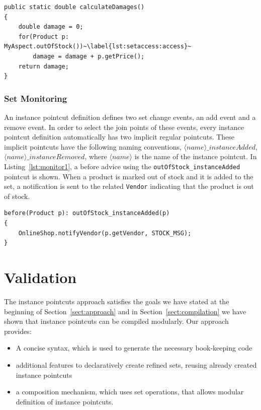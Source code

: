 \documentclass{acm_proc_article-sp}
\newcommand{\lstinln}[1]{\lstinline~#1~}
\begin{document}
\begin{lstlisting}[float=h!, caption={Calculate a damage estimate for out of stock products}, label={lst:setaccess}]
public static double calculateDamages()
{
	double damage = 0;
	for(Product p: MyAspect.outOfStock())~\label{lst:setaccess:access}~
		damage = damage + p.getPrice();
	return damage;
}
\end{lstlisting}



\subsubsection{Set Monitoring}
An instance pointcut definition defines two set change events, an add event and a remove event. In order to select the join points of these events, every instance pointcut definition automatically has two implicit regular pointcuts. These implicit pointcuts have the following naming conventions, $\langle name \rangle\_instanceAdded$, $\langle name \rangle\_instanceRemoved$, where $\langle name \rangle$ is the name of the instance pointcut. In Listing~\ref{lst:monitor1}, a before advice using the \lstinln{outOfStock_instanceAdded} pointcut is shown. 
When a product is marked out of stock and it is added to the set, a notification is sent to the related \lstinln{Vendor} indicating that the product is out of stock.

\begin{lstlisting}[float=h!, caption={Set monitoring pointcut used to notify vendors}, label={lst:monitor1}]
before(Product p): outOfStock_instanceAdded(p)
{
	OnlineShop.notifyVendor(p.getVendor, STOCK_MSG);
}
\end{lstlisting}




\section{Validation}
\label{sect:checking}
The instance pointcuts approach satisfies the goals we have stated at the beginning of Section~\ref{sect:approach} and in Section~\ref{sect:compilation} we have shown that instance pointcuts can be compiled modularly. 
Our approach provides:

\begin{itemize}
\item A concise syntax, which is used to generate the necessary book-keeping code
\item additional features to declaratively create refined sets, reusing already created instance pointcuts
\item a composition mechanism, which uses set operations, that allows modular definition of instance pointcuts.
\end{itemize}
\end{document}

